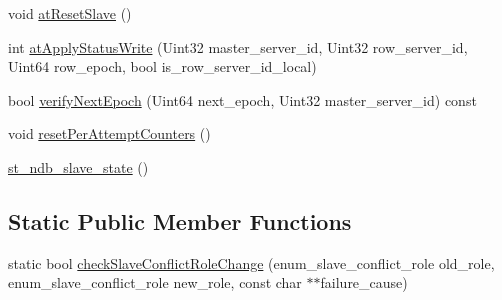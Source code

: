 \begin{DoxyCompactItemize}
\item 
void \mbox{\hyperlink{structst__ndb__slave__state_af4b936c6ad89721386871d7d4808a806}{at\+Reset\+Slave}} ()
\item 
int \mbox{\hyperlink{structst__ndb__slave__state_ae64bc5c0385b491b5791b40296df0c41}{at\+Apply\+Status\+Write}} (Uint32 master\+\_\+server\+\_\+id, Uint32 row\+\_\+server\+\_\+id, Uint64 row\+\_\+epoch, bool is\+\_\+row\+\_\+server\+\_\+id\+\_\+local)
\item 
bool \mbox{\hyperlink{structst__ndb__slave__state_a726e16b6e2106a13558117de0ba37757}{verify\+Next\+Epoch}} (Uint64 next\+\_\+epoch, Uint32 master\+\_\+server\+\_\+id) const
\item 
void \mbox{\hyperlink{structst__ndb__slave__state_a366692bd209be04ea4b61608dcc2780e}{reset\+Per\+Attempt\+Counters}} ()
\item 
\mbox{\hyperlink{structst__ndb__slave__state_a9388ae521718af871f0fafe8d4312baa}{st\+\_\+ndb\+\_\+slave\+\_\+state}} ()
\end{DoxyCompactItemize}
\subsection*{Static Public Member Functions}
\begin{DoxyCompactItemize}
\item 
static bool \mbox{\hyperlink{structst__ndb__slave__state_a51b92c9d78e009560db169c28cf9aaf9}{check\+Slave\+Conflict\+Role\+Change}} (enum\+\_\+slave\+\_\+conflict\+\_\+role old\+\_\+role, enum\+\_\+slave\+\_\+conflict\+\_\+role new\+\_\+role, const char $\ast$$\ast$failure\+\_\+cause)
\end{DoxyCompactItemize}
